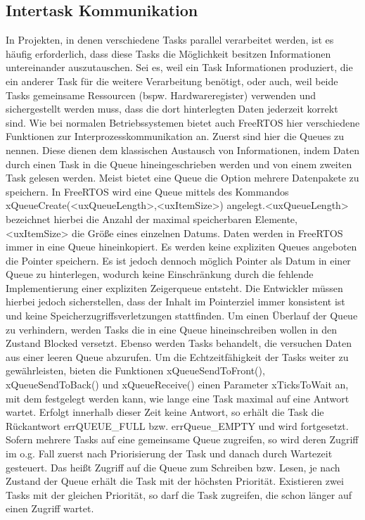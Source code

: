 \subsection{Intertask Kommunikation}
In Projekten, in denen verschiedene Tasks parallel verarbeitet werden, ist es häufig erforderlich, dass diese Tasks die Möglichkeit besitzen Informationen untereinander auszutauschen. Sei es, weil ein Task Informationen produziert, die ein anderer Task für die weitere Verarbeitung benötigt, oder auch, weil beide Tasks gemeinsame Ressourcen (bspw. Hardwareregister) verwenden und sichergestellt werden muss, dass die dort hinterlegten Daten jederzeit korrekt sind. Wie bei normalen Betriebssystemen bietet auch FreeRTOS hier verschiedene Funktionen zur Interprozesskommunikation an. Zuerst sind hier die Queues zu nennen. Diese dienen dem klassischen Austausch von Informationen, indem Daten durch einen Task in die Queue hineingeschrieben werden und von einem zweiten Task gelesen werden. Meist bietet eine Queue die Option mehrere Datenpakete zu speichern. In FreeRTOS wird eine Queue mittels des Kommandos xQueueCreate(<uxQueueLength>,<uxItemSize>) angelegt.<uxQueueLength> bezeichnet hierbei die Anzahl der maximal speicherbaren Elemente, <uxItemSize> die Größe eines einzelnen Datums. Daten werden in FreeRTOS immer in eine Queue hineinkopiert. 
Es werden keine expliziten Queues angeboten die Pointer speichern. Es ist jedoch dennoch möglich Pointer als Datum in einer Queue zu hinterlegen, wodurch keine Einschränkung durch die fehlende Implementierung einer expliziten Zeigerqueue entsteht. Die Entwickler müssen hierbei jedoch sicherstellen, dass der Inhalt im Pointerziel immer konsistent ist und keine Speicherzugriffsverletzungen stattfinden.
Um einen Überlauf der Queue zu verhindern, werden Tasks die in eine Queue hineinschreiben wollen in den Zustand Blocked versetzt. Ebenso werden Tasks behandelt, die versuchen Daten aus einer leeren Queue abzurufen. Um die Echtzeitfähigkeit der Tasks weiter zu gewährleisten, bieten die Funktionen xQueueSendToFront(), xQueueSendToBack() und xQueueReceive() einen Parameter xTicksToWait an, mit dem festgelegt werden kann, wie lange eine Task maximal auf eine Antwort wartet. Erfolgt innerhalb dieser Zeit keine Antwort, so erhält die Task die Rückantwort errQUEUE\_FULL bzw. errQueue\_EMPTY und wird fortgesetzt. 
Sofern mehrere Tasks auf eine gemeinsame Queue zugreifen, so wird deren Zugriff im o.g. Fall zuerst nach Priorisierung der Task und danach durch Wartezeit gesteuert. Das heißt Zugriff auf die Queue zum Schreiben bzw. Lesen, je nach Zustand der Queue erhält die Task mit der höchsten Priorität. Existieren zwei Tasks mit der gleichen Priorität, so darf die Task zugreifen, die schon länger auf einen Zugriff wartet.
